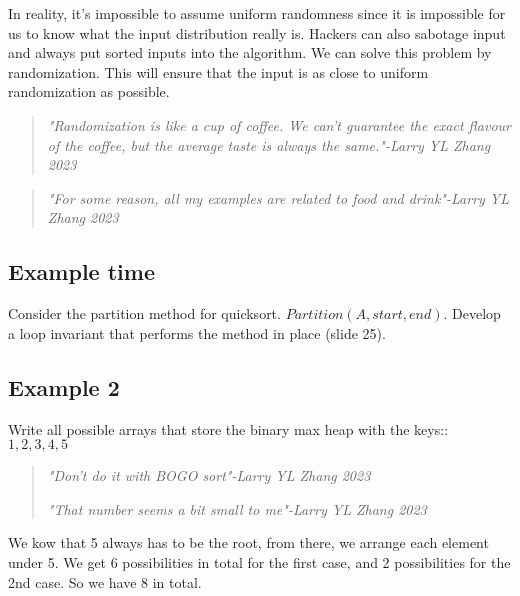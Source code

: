 \documentclass[12pt]{article}
\begin{document}
In reality, it's impossible to assume uniform randomness since it is impossible for us to know what the input distribution really is. Hackers can also sabotage input and always put sorted inputs into the algorithm. We can solve this problem by randomization. This will ensure that the input is as close to uniform randomization as possible.

\begin{quote}
    \textit{"Randomization is like a cup of coffee. We can't guarantee the exact flavour of the coffee, but the average taste is always the same."-Larry YL Zhang 2023}
\end{quote}

\begin{quote}
    \textit{"For some reason, all my examples are related to food and drink"-Larry YL Zhang 2023}
\end{quote}

\subsection*{Example time}

Consider the partition method for quicksort. $Partition(A,start,end)$. Develop a loop invariant that performs the method in place (slide 25).

\subsection*{Example 2}

Write all possible arrays that store the binary max heap with the keys:: $1,2,3,4,5$

\begin{quote}
    \textit{"Don't do it with BOGO sort"-Larry YL Zhang 2023}

    \textit{"That number seems a bit small to me"-Larry YL Zhang 2023}
\end{quote}

We kow that 5 always has to be the root, from there, we arrange each element under 5. We get 6 possibilities in total for the first case, and 2 possibilities for the 2nd case. So we have 8 in total.
\end{document}
